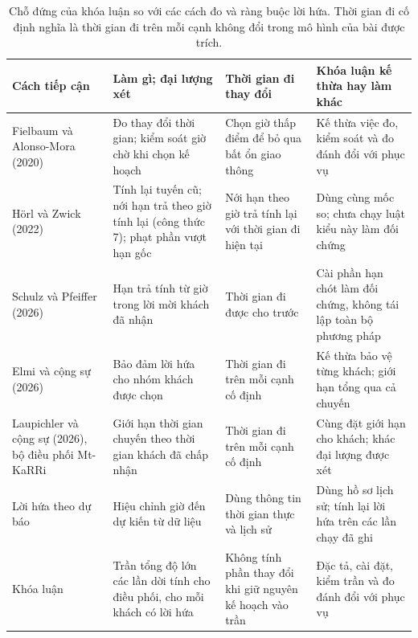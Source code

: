 \begin{table}[htbp]
\centering
\caption{Chỗ đứng của khóa luận so với các cách đo và ràng buộc lời hứa. Thời gian đi cố định nghĩa là
thời gian đi trên mỗi cạnh không đổi trong mô hình của bài được trích.}
\label{bang:c1-chodung}
\footnotesize
\begin{tabular}{@{}p{2.8cm}p{4.0cm}p{3.3cm}p{4.5cm}@{}}
\toprule
\textbf{Cách tiếp cận} & \textbf{Làm gì; đại lượng xét} &
\textbf{Thời gian đi thay đổi} & \textbf{Khóa luận kế thừa hay làm khác}\\
\midrule
Fielbaum và Alonso-Mora (2020)~\cite{fielbaum2020}
& Đo thay đổi thời gian; kiểm soát giờ chờ khi chọn kế hoạch
& Chọn giờ thấp điểm để bỏ qua bất ổn giao thông
& Kế thừa việc đo, kiểm soát và đo đánh đổi với phục vụ\\
Hörl và Zwick (2022)~\cite{horl2022}
& Tính lại tuyến cũ; nới hạn trả theo giờ tính lại (công thức 7); phạt phần vượt hạn gốc
& Nới hạn theo giờ trả tính lại với thời gian đi hiện tại
& Dùng cùng mốc so; chưa chạy luật kiểu này làm đối chứng\\
Schulz và Pfeiffer (2026)~\cite{schulz2026}
& Hạn trả tính từ giờ trong lời mời khách đã nhận
& Thời gian đi được cho trước
& Cài phần hạn chót làm đối chứng, không tái lập toàn bộ phương pháp\\
Elmi và cộng sự (2026)~\cite{elmi2026}
& Bảo đảm lời hứa cho nhóm khách được chọn
& Thời gian đi trên mỗi cạnh cố định
& Kế thừa bảo vệ từng khách; giới hạn tổng qua cả chuyến\\
Laupichler và cộng sự (2026), bộ điều phối Mt-KaRRi~\cite{laupichler2026}
& Giới hạn thời gian chuyến theo thời gian khách đã chấp nhận
& Thời gian đi trên mỗi cạnh cố định
& Cùng đặt giới hạn cho khách; khác đại lượng được xét\\
Lời hứa theo dự báo~\cite{hu2022}
& Hiệu chỉnh giờ đến dự kiến từ dữ liệu
& Dùng thông tin thời gian thực và lịch sử
& Dùng hồ sơ lịch sử; tính lại lời hứa trên các lần chạy đã ghi\\
Khóa luận
& Trần tổng độ lớn các lần dời tính cho điều phối, cho mỗi khách có lời hứa
& Không tính phần thay đổi khi giữ nguyên kế hoạch vào trần
& Đặc tả, cài đặt, kiểm trần và đo đánh đổi với phục vụ\\
\bottomrule
\end{tabular}
\end{table}

